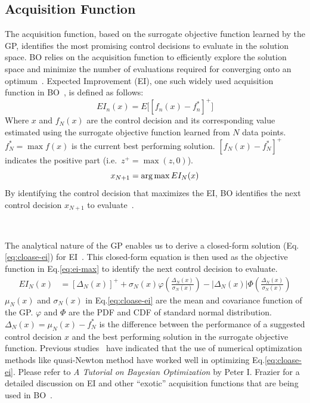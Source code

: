 \subsection{Acquisition Function}
The acquisition function, based on the surrogate objective function learned by the GP, identifies the most promising control decisions to evaluate in the solution space.
BO relies on the acquisition function to efficiently explore the solution space and minimize the number of evaluations required for converging onto an optimum~\cite{frazier2018tutorial}.
Expected Improvement (EI), one such widely used acquisition function in BO~\cite{jones1998efficient, frazier2018tutorial}, is defined as follows:
\begin{equation}\label{eq:EI}
		EI_n(x) = E \big[ {[ f_n(x) - f^*_n ]}^+ \big]
\end{equation}
Where $x$ and $f_N(x)$ are the control decision and its corresponding value estimated using the surrogate objective function learned from $N$ data points.
$f^*_N = \max f(x)$ is the current best performing solution. 
${[ f_N(x) - f^*_N ]}^+$ indicates the positive part (i.e.\ $z^+ = \max (z, 0)$).
\begin{equation}\label{eq:ei-max}
	x_{N+1} = \operatorname*{arg\,max} EI_N(x)
\end{equation}
By identifying the control decision that maximizes the EI, BO identifies the next control decision $x_{N+1}$ to evaluate~\cite{frazier2018tutorial}. 

\

The analytical nature of the GP enables us to derive a closed-form solution (Eq.\ref{eq:cloase-ei}) for EI~\cite{jones1998efficient}.
This closed-form equation is then used as the objective function in Eq.\ref{eq:ei-max} to identify the next control decision to evaluate.
\begin{align}\label{eq:cloase-ei}
	EI_N(x) &= {[\Delta_N(x)]}^+ + \sigma_N(x) \varphi(\frac{\Delta_N(x)}{\sigma_N(x)}) - |\Delta_N(x)| \Phi(\frac{\Delta_N(x)}{\sigma_N(x)})
\end{align}
$\mu_N(x)$ and $\sigma_N(x)$ in Eq.\ref{eq:cloase-ei} are the mean and covariance function of the GP.
$\varphi$ and $\Phi$ are the PDF and CDF of standard normal distribution.
$\Delta_N(x) = \mu_N(x) - f^*_N$ is the difference between the performance of a suggested control decision $x$ and the best performing solution in the surrogate objective function.
Previous studies~\cite{frazier2018tutorial} have indicated that the use of numerical optimization methods like quasi-Newton method have worked well in optimizing Eq.\ref{eq:cloase-ei}.
Please refer to \textit{A Tutorial on Bayesian Optimization} by Peter I. Frazier for a detailed discussion on EI and other ``exotic'' acquisition functions that are being used in BO~\cite{frazier2018tutorial}.

